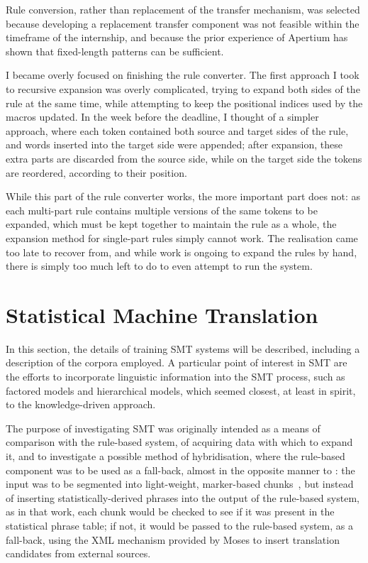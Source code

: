 Rule conversion, rather than replacement of the transfer mechanism, was selected because developing
a replacement transfer component was not feasible within the timeframe of the internship, and because
the prior experience of Apertium has shown that fixed-length patterns can be sufficient.

I became overly focused on finishing the rule converter. The first approach I took to recursive
expansion was overly complicated, trying to expand both sides of the rule at the same time, while
attempting to keep the positional indices used by the macros updated. In the week before the
deadline, I thought of a simpler approach, where each token contained both source and target sides
of the rule, and words inserted into the target side were appended; after expansion, these extra
parts are discarded from the source side, while on the target side the tokens are reordered,
according to their position.

While this part of the rule converter works, the more important part does not: as each multi-part
rule contains multiple versions of the same tokens to be expanded, which must be kept together
to maintain the rule as a whole, the expansion method for single-part rules simply cannot work.
The realisation came too late to recover from, and while work is ongoing to expand the rules
by hand, there is simply too much left to do to even attempt to run the system.

\section{Statistical Machine Translation}
\label{sect:ch3smt}

In this section, the details of training SMT systems will be described, including a description of the 
corpora employed. A particular point of interest in SMT are the efforts to incorporate linguistic information into the SMT 
process, such as factored models and hierarchical models, which seemed closest, at least in spirit, to
the knowledge-driven approach.

The purpose of investigating SMT was originally intended as a means of comparison
with the rule-based system, of acquiring data with which to expand it, and to investigate a possible 
method of hybridisation, where the rule-based component was to be used as a fall-back, almost in the
opposite manner to \citet{sanchezmartinez09d}: the input was to be segmented into light-weight, marker-based
chunks~\citep[e.g.,][]{gough2004robust}, but instead of inserting statistically-derived phrases into the output of the rule-based system, 
as in that work, each chunk would be checked to see if it was present in the statistical phrase table; 
if not, it would be passed to the rule-based system, as a fall-back, using the XML mechanism provided
by Moses to insert translation candidates from external sources.

